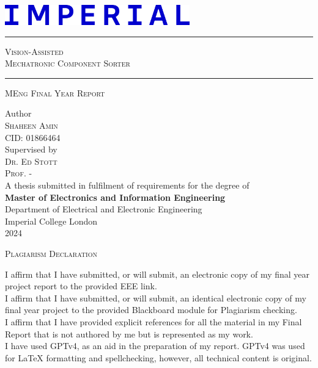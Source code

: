 \documentclass[12pt, a4paper]{article}
\begin{document}
\begin{titlepage}
  \noindent
  \includegraphics[width=80mm]{imgs/icl_logo.png}

  \centering
  \vspace{3.5cm}

  \rule{\textwidth}{0.5pt}
  \huge \textsc{Vision-Assisted\\Mechatronic Component Sorter}
  \rule{\textwidth}{0.5pt}

  \vspace{1cm}
  \LARGE \textsc{MEng Final Year Report}
  
  \vspace{3cm}
  \large  Author\\
  \Large  \textsc{Shaheen Amin}\\
  \Large CID: 01866464\\

  \vspace{1.5cm}
  \large Supervised by\\
  \Large \textsc{Dr. Ed Stott}\\
  \Large \textsc{Prof. -}\\

  \vfill
  \normalsize
  A thesis submitted in fulfilment of requirements for the degree of\\
  \textbf{Master of Electronics and Information Engineering}\\
  
  \vspace{0.5cm}
  \normalsize
  Department of Electrical and Electronic Engineering\\
  Imperial College London\\
  2024
  \vspace{1cm}
\end{titlepage}

\newpage
\vspace*{\fill}
\begin{center}
  \large\textsc{Plagiarism Declaration}\\
\end{center}
\noindent I affirm that I have submitted, or will submit, an electronic copy of my final year project report to the provided EEE link.\\
\noindent I affirm that I have submitted, or will submit, an identical electronic copy of my final year project to the provided Blackboard module for Plagiarism checking.\\
\noindent I affirm that I have provided explicit references for all the material in my Final Report that is not authored by me but is represented as my work.\\
\noindent I have used GPTv4, as an aid in the preparation of my report. GPTv4 was used for LaTeX formatting and spellchecking, however, all technical content is original.\\
\vspace*{\fill}
\end{document}
